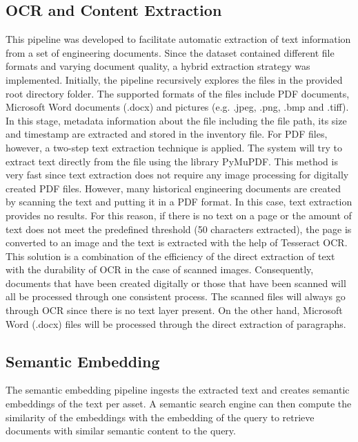 \subsection{OCR and Content Extraction}
This pipeline was developed to facilitate automatic extraction of text information from a set of engineering documents. 
Since the dataset contained different file formats and varying document quality, a hybrid extraction strategy was implemented. 
Initially, the pipeline recursively explores the files in the provided root directory folder. 
The supported formats of the files include PDF documents, Microsoft Word documents (.docx) and pictures (e.g. .jpeg, .png, .bmp and .tiff). 
In this stage, metadata information about the file including the file path, its size and timestamp are extracted and stored in the inventory file. 
For PDF files, however, a two-step text extraction technique is applied. 
The system will try to extract text directly from the file using the library PyMuPDF. 
This method is very fast since text extraction does not require any image processing for digitally created PDF files. 
However, many historical engineering documents are created by scanning the text and putting it in a PDF format. 
In this case, text extraction provides no results. 
For this reason, if there is no text on a page or the amount of text does not meet the predefined threshold (50 characters extracted), the page is converted to an image and the text is extracted with the help of Tesseract OCR.
This solution is a combination of the efficiency of the direct extraction of text with the durability of OCR in the case of scanned images. 
Consequently, documents that have been created digitally or those that have been scanned will all be processed through one consistent process. 
The scanned files will always go through OCR since there is no text layer present. 
On the other hand, Microsoft Word (.docx) files will be processed through the direct extraction of paragraphs.

\subsection{Semantic Embedding}

The semantic embedding pipeline ingests the extracted text and creates semantic embeddings of the text per asset. 
A semantic search engine can then compute the similarity of the embeddings with the embedding of the query to retrieve documents with similar semantic content to the query.


